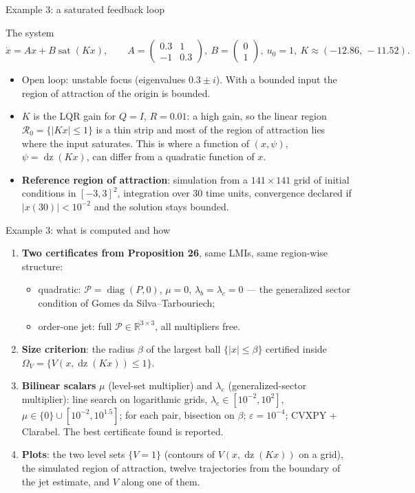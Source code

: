 \documentclass[10pt,aspectratio=169]{beamer}
\newcommand{\R}{\mathbb{R}}
\newcommand{\PP}{\mathcal{P}}
\newcommand{\dz}{\operatorname{dz}}
\newcommand{\sat}{\operatorname{sat}}
\DeclareMathOperator{\diag}{diag}
\begin{document}
\begin{frame}{Example 3: a saturated feedback loop}
\begin{block}{The system}
\[
\dot x=Ax+B\sat(Kx),\qquad A=\begin{pmatrix}0.3&1\\-1&0.3\end{pmatrix},\ B=\begin{pmatrix}0\\1\end{pmatrix},\ u_0=1,\ K\approx(-12.86,\,-11.52).
\]
\end{block}
\begin{itemize}
\item Open loop: unstable focus (eigenvalues $0.3\pm i$). With a bounded input the region of attraction of the origin is bounded.
\item $K$ is the LQR gain for $Q=I$, $R=0.01$: a high gain, so the linear region $\mathcal R_0=\{|Kx|\le1\}$ is a thin strip and most of the region of attraction lies where the input saturates. This is where a function of $(x,\psi)$, $\psi=\dz(Kx)$, can differ from a quadratic function of $x$.
\item \textbf{Reference region of attraction}: simulation from a $141\times141$ grid of initial conditions in $[-3,3]^2$, integration over $30$ time units, convergence declared if $|x(30)|<10^{-2}$ and the solution stays bounded.
\end{itemize}
\end{frame}

\begin{frame}{Example 3: what is computed and how}
\begin{enumerate}
\item \textbf{Two certificates from Proposition 26}, same LMIs, same region-wise structure:
\begin{itemize}
\item quadratic: $\PP=\diag(P,0)$, $\mu=0$, $\lambda_b=\lambda_c=0$ --- the generalized sector condition of Gomes da Silva--Tarbouriech;
\item order-one jet: full $\PP\in\R^{3\times3}$, all multipliers free.
\end{itemize}
\item \textbf{Size criterion}: the radius $\beta$ of the largest ball $\{|x|\le\beta\}$ certified inside $\Omega_V=\{V(x,\dz(Kx))\le1\}$.
\item \textbf{Bilinear scalars} $\mu$ (level-set multiplier) and $\lambda_e$ (generalized-sector multiplier): line search on logarithmic grids, $\lambda_e\in[10^{-2},10^{2}]$, $\mu\in\{0\}\cup[10^{-2},10^{1.5}]$; for each pair, bisection on $\beta$; $\varepsilon=10^{-4}$; CVXPY + Clarabel. The best certificate found is reported.
\item \textbf{Plots}: the two level sets $\{V=1\}$ (contours of $V(x,\dz(Kx))$ on a grid), the simulated region of attraction, twelve trajectories from the boundary of the jet estimate, and $V$ along one of them.
\end{enumerate}
\end{frame}
\end{document}
